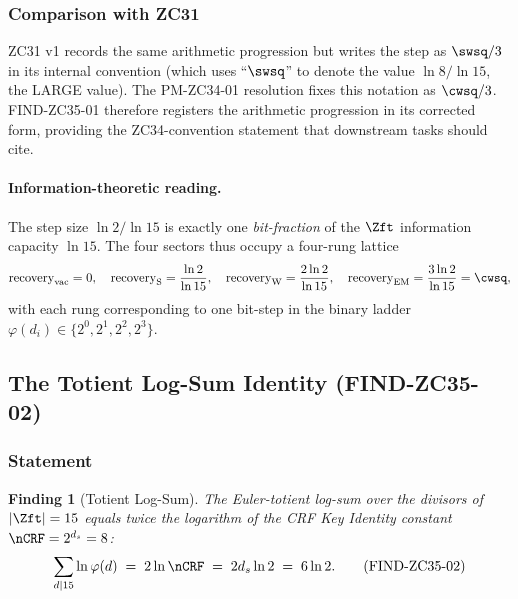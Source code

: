 \documentclass[12pt, a4paper]{article}
\newtheorem{finding}{Finding}[section]
\begin{document}
\subsubsection{Comparison with ZC31}

ZC31 v1 records the same arithmetic progression but writes the step as
$\swsq/3$ in its internal convention (which uses ``$\swsq$'' to denote
the value $\ln 8/\ln 15$, the LARGE value). The PM-ZC34-01 resolution
fixes this notation as $\cwsq/3$. FIND-ZC35-01 therefore registers the
arithmetic progression in its corrected form, providing the
ZC34-convention statement that downstream tasks should cite.

\paragraph{Information-theoretic reading.}
The step size $\ln 2/\ln 15$ is exactly one \emph{bit-fraction} of the
$\Zft$ information capacity $\ln 15$. The four sectors thus occupy a
four-rung lattice
\[
  \text{recovery}_{\rm vac} = 0,\quad
  \text{recovery}_{\rm S} = \frac{\ln 2}{\ln 15},\quad
  \text{recovery}_{\rm W} = \frac{2\ln 2}{\ln 15},\quad
  \text{recovery}_{\rm EM} = \frac{3\ln 2}{\ln 15} = \cwsq,
\]
with each rung corresponding to one bit-step in the binary ladder
$\varphi(d_i) \in \{2^0, 2^1, 2^2, 2^3\}$.

\subsection{The Totient Log-Sum Identity (FIND-ZC35-02)}
\label{sec:find-zc35-02}

\subsubsection{Statement}

\begin{finding}[Totient Log-Sum]\label{find:zc35-02}
The Euler-totient log-sum over the divisors of $|\Zft| = 15$ equals
twice the logarithm of the CRF Key Identity constant
$\nCRF = 2^{d_s} = 8$:
\begin{equation}
  \sum_{d \mid 15} \ln \varphi(d) \;=\; 2 \ln \nCRF
  \;=\; 2 d_s \ln 2 \;=\; 6 \ln 2.
  \tag{FIND-ZC35-02}\label{eq:find-zc35-02}
\end{equation}
\end{finding}
\end{document}
